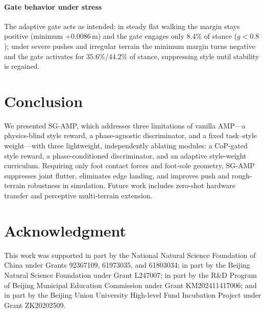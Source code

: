 \documentclass[conference]{IEEEtran}
\begin{document}
\paragraph{Gate behavior under stress}
The adaptive gate acts as intended: in steady flat walking the margin stays positive (minimum $+0.0086$\,m) and the gate engages only $8.4\%$ of stance ($g<0.8$); under severe pushes and irregular terrain the minimum margin turns negative and the gate activates for $35.6\%$/$44.2\%$ of stance, suppressing style until stability is regained.

\section{Conclusion}
\label{sec:conclusion}

We presented SG-AMP, which addresses three limitations of vanilla AMP---a physics-blind style reward, a phase-agnostic discriminator, and a fixed task--style weight---with three lightweight, independently ablating modules: a CoP-gated style reward, a phase-conditioned discriminator, and an adaptive style-weight curriculum. Requiring only foot contact forces and foot-sole geometry, SG-AMP suppresses joint flutter, eliminates edge landing, and improves push and rough-terrain robustness in simulation. Future work includes zero-shot hardware transfer and perceptive multi-terrain extension.

\section*{Acknowledgment}
This work was supported in part by the National Natural Science Foundation of China under Grants 92367109, 61973035, and 61803034; in part by the Beijing Natural Science Foundation under Grant L247007; in part by the R\&D Program of Beijing Municipal Education Commission under Grant KM202411417006; and in part by the Beijing Union University High-level Fund Incubation Project under Grant ZK20202509.



\end{document}
